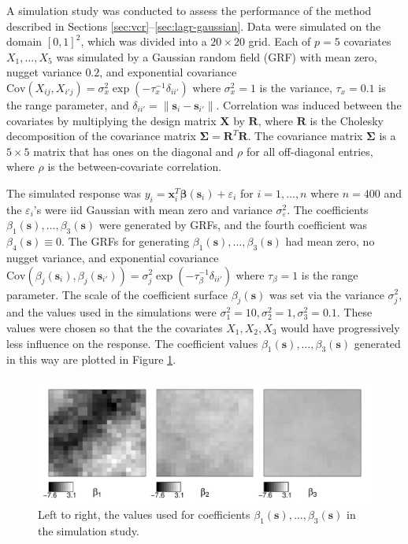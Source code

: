 \documentclass[authoryear,review, 12pt]{elsarticle}
\begin{document}
A simulation study was conducted to assess the performance of the
method described in Sections \ref{sec:vcr}--\ref{sec:lagr-gaussian}.
Data were simulated on the domain $[0,1]^{2}$, which was divided
into a $20\times20$ grid. Each of $p=5$ covariates $X_{1},\dots,X_{5}$
was simulated by a Gaussian random field (GRF) with mean zero, nugget variance $0.2$, and exponential
covariance $\text{Cov}\left(X_{ij},X_{i'j}\right)=\sigma_{x}^{2}\exp\left(-\tau_{x}^{-1}\delta_{ii'}\right)$
where $\sigma_{x}^{2}=1$ is the variance, $\tau_{x}=0.1$ is the
range parameter, and $\delta_{ii'}=\|\bm{s}_{i}-\bm{s}_{i'}\|$. Correlation
was induced between the covariates by multiplying the design matrix
$\bm{X}$ by $\bm{R}$, where $\bm{R}$ is the Cholesky decomposition
of the covariance matrix $\bm{\Sigma}=\bm{R}^{T}\bm{R}$. The covariance
matrix $\bm{\Sigma}$ is a $5\times5$ matrix that has ones on the
diagonal and $\rho$ for all off-diagonal entries, where $\rho$ is
the between-covariate correlation. 

The simulated response was $y_{i}=\bm{x}_{i}^{T}\bm{\beta}(\bm{s}_{i})+\varepsilon_{i}$
for $i=1,\dots,n$ where $n=400$ and the $\varepsilon_{i}$'s were
iid Gaussian with mean zero and variance $\sigma_{\varepsilon}^{2}$.
The coefficients $\beta_1(\bm{s}), \dots, \beta_3(\bm{s})$ were generated by GRFs, and the fourth coefficient was $\beta_4(\bm{s}) \equiv 0$.
The GRFs for generating $\beta_1(\bm{s}), \dots, \beta_3(\bm{s})$ had mean zero, no nugget variance, and exponential
covariance $\text{Cov}\left(\beta_j(\bm{s}_i), \beta_j(\bm{s}_{i'})\right)=\sigma_j^2 \exp\left(-\tau_{\beta}^{-1}\delta_{ii'}\right)$
where $\tau_{\beta}=1$ is the range parameter. The scale of the coefficient surface $\beta_j(\bm{s})$ was set via the variance $\sigma_j^2$, and the values used in the simulations were $\sigma_1^2 = 10, \sigma_2^2=1, \sigma_3^2=0.1$.
These values were chosen so that the the covariates $X_1, X_2, X_3$ would have progressively less influence on the response.
The coefficient values $\beta_1(\bm{s}), \dots, \beta_3(\bm{s})$ generated in this way are plotted in Figure \ref{fig:simulation-coefficients}.

\begin{figure}
    \includegraphics[width=\textwidth]{figure/coefs.pdf}
    \caption{Left to right, the values used for coefficients $\beta_1(\bm{s}), \dots, \beta_3(\bm{s})$ in the simulation study. \label{fig:simulation-coefficients}}
\end{figure}
\end{document}

